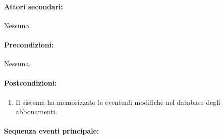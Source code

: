 \documentclass{article}
\begin{document}
	\paragraph{Attori secondari:}Nessuno.
	
	\paragraph{Precondizioni:}Nessuna.
	
	\paragraph{Postcondizioni:}
			\begin{enumerate}	[leftmargin=28pt]
\item Il sistema ha memorizzato le eventuali modifiche nel database degli abbonamenti.
\end{enumerate}
	
	\paragraph{Sequenza eventi principale:}
\end{document}

